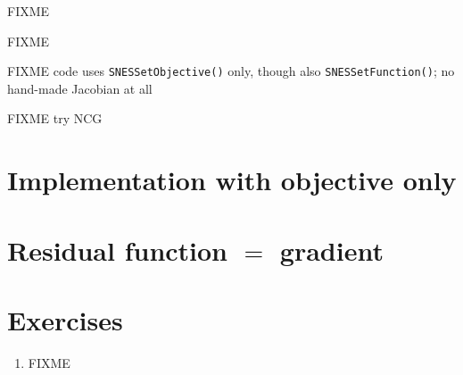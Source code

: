 FIXME

\begin{marginfigure}

\caption{FIXME}
\label{fig:q1hat}
\end{marginfigure}

FIXME code uses \texttt{SNESSetObjective()} only, though also \texttt{SNESSetFunction()}; no hand-made Jacobian at all

FIXME try NCG

\section{Implementation with objective only}






\section{Residual function $=$ gradient}



\section{Exercises}

\renewcommand{\labelenumi}{\arabic{chapter}.\arabic{enumi}\quad}
\renewcommand{\labelenumii}{(\alph{enumii})}
\begin{enumerate}
\item FIXME
\end{enumerate}